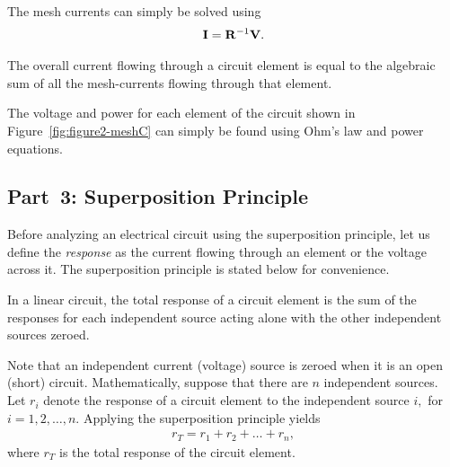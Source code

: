 %
The mesh currents can simply be solved using %
%
\begin{align}
{\bf I} = {\bf R}^{-1}{\bf V}.
  \label{eq:meshCurrentSolution}
\end{align}
%
\begin{mdframed}[roundcorner=5pt,backgroundcolor=yellow!5]
  The overall current flowing through a circuit element is equal to the algebraic sum of all the mesh-currents flowing through that element. 
\end{mdframed}

The voltage and power for each element of the circuit shown in Figure~\ref{fig:figure2-meshC} can simply be found using Ohm's law and power equations.

\subsection{Part~3: Superposition Principle}
\label{sec:superpositionPrinciple}
Before analyzing an electrical circuit using the superposition principle, let us define the \emph{response} as the current flowing through an element or the voltage across it. The superposition principle is stated below for convenience. 

\begin{mdframed}[roundcorner=5pt,backgroundcolor=yellow!5]
In a linear circuit,   the total response of a circuit element is the sum of the responses for  each independent source acting alone with the other independent sources zeroed.  
\end{mdframed}
Note that an independent current (voltage) source is zeroed when it is an open (short) circuit. Mathematically, suppose that there are $n$  independent sources. Let $r_i$ denote the response of a circuit element to the independent source $i,$ for $i=1,2,\ldots,n.$ Applying the superposition principle yields %
%
\begin{align*}
  r_T = r_1 + r_2+\ldots + r_n,
\end{align*}
%
where $r_T$ is the total response of the circuit element.

